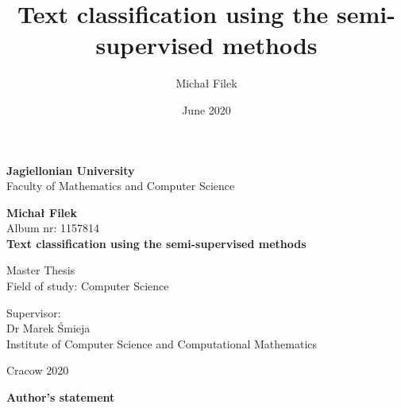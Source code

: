 \documentclass[12pt]{article}
\title{Text classification using the semi-supervised methods}
\author{Michał Filek}
\date{June 2020}
\theoremstyle{definition}
\DeclareRobustCommand{\[}{\begin{equation}}
\DeclareRobustCommand{\]}{\end{equation}}
\begin{document}
\setlength{\parskip}{0.25 \baselineskip}
\newlength{\figwidth}
\setlength{\figwidth}{26pc}
\newlength{\notationgap}
\setlength{\notationgap}{1pc}
\setlength{\parindent}{4ex}
\thispagestyle{empty}
\begin{titlepage}
    \begin{center}

           \Large
	\textbf{Jagiellonian University}\vspace{0.2cm}\\ Faculty of Mathematics and Computer Science
               \vspace*{1cm}
               
         \vspace{3cm}
         \Large
          \textbf{Michał Filek}\\\vspace{0.5cm}
         \normalsize Album nr: 1157814\\
             \vspace{2cm}
        \Huge
        \textbf{Text classification using the semi-supervised methods }
      
        \vspace{1.5cm}
        \normalsize
        Master Thesis\\
        Field of study: Computer Science\\ \vspace{0.15cm}
        
        \vfill
        \vspace{2cm}
       \begin{minipage}{1\textwidth}
\begin{flushright}
Supervisor:\\
Dr Marek Śmieja\\
Institute of Computer Science and Computational Mathematics
\end{flushright}
\end{minipage}
        
        \vspace{2cm}
        \begin{center}
      Cracow 2020
        \end{center}
    \end{center}
\end{titlepage}

\newpage 
 \thispagestyle{empty}
\vspace{2.5cm}
\begin{flushleft}
\large \textbf{Author's statement}\vspace{0.6cm}\\
\end{flushleft}
\end{document}
